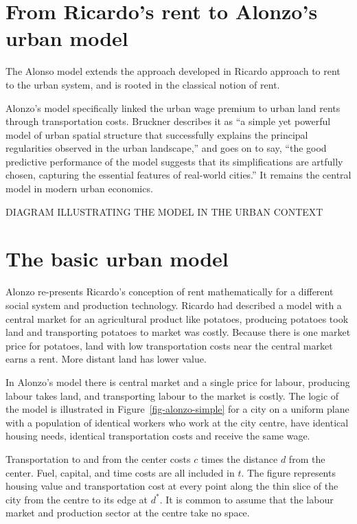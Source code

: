 
\section{From Ricardo's rent to Alonzo's urban model}


The Alonso model extends the approach developed in Ricardo approach to rent to the urban system, and is %
rooted in the classical notion of rent. 

 Alonzo's  model  specifically linked the urban wage premium to urban land rents through transportation costs.  
 Bruckner \cite{bruecknerStructureUrbanEquilibria1987} describes it as ``a simple yet powerful model of urban spatial structure that successfully explains the principal regularities observed in the urban landscape,'' and goes on to say, ``the good predictive performance of the model suggests that its simplifications are artfully chosen, capturing the essential features of real-world cities.'' It remains the central model in modern urban economics.

 DIAGRAM ILLUSTRATING THE MODEL IN THE URBAN CONTEXT

\section{The basic urban model}
Alonzo re-presents Ricardo's conception of rent  mathematically for a different social system and production technology.  Ricardo had described a model with a central market for an agricultural product like potatoes, producing potatoes took land and transporting potatoes to market was costly. Because there is one market price for potatoes, land with low transportation costs near the central market earns a rent. More distant land has lower value. 

In Alonzo's model there is central market and a single price for labour, producing labour takes land, and transporting labour to the market is costly. 
The logic of the model is illustrated in Figure~\ref{fig-alonzo-simple} for a city on a uniform plane with a population of identical workers who work at the city centre, have identical housing needs, identical transportation costs and receive the same wage. 

Transportation to and from the center costs ${c}$ times the distance $d$ from the center. Fuel, capital, and time costs are  all included in $t$. The figure represents housing value and transportation cost at every point along the thin slice of the city from the centre to its edge at $d^*$.  It is common to assume that the labour market and production sector at the centre take no space. 

